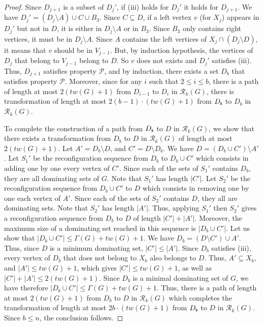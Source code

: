 \documentclass[10pt]{article}
\newcommand{\source}{{\sf s}}
\begin{document}
\begin{proof}
Since $D_{j+1}$ is a subset of $D_{j}'$, if (iii) holds for $D_j'$ it holds for $D_{j+1}$. We have $D_j'=(D_j\setminus A)\cup C \cup B_3$.
Since $C \subseteq D$, if a left vertex $v$ (for $X_j$) appears in $D_j'$ but not in $D$, it is either in $D_j \setminus A$ or in $B_3$. Since $B_3$ only contains right vertices, it must be in $D_j \setminus A$. Since $A$ contains the left vertices of $X_j \cap (D_j \setminus D)$, it means that $v$ should be in $V_{j-1}$. But, by induction hypothesis, the vertices of $D_j$ that belong to $V_{j-1}$ belong to $D$. So $v$ does not exists and $D_j'$ satisfies (iii). Thus, $D_{j+1}$ satisfies property $\mathcal{P}$, and by induction, there exists a set $D_{b}$ that satisfies property $\mathcal{P}$. Moreover, since for any $i$ such that $2\leq i\leq b$, there is a path of length at most $2(tw(G)+1)$ from $D_{i-1}$ to $D_{i}$ in $\mathcal{R}_k(G)$, there is transformation of length at most $2(b-1)\cdot(tw(G)+1)$ from $D_\source$ to $D_b$ in $\mathcal{R}_k(G)$. 
\medskip

To complete the construction of a path from $D_\source$ to $D$ in $\mathcal{R}_k(G)$, we show that there exists a transformation from $D_b$ to $D$ in $\mathcal{R}_k(G)$ of length at most $2(tw(G)+1)$.
Let $A'=D_b\setminus D$, and $C'=D\setminus D_b$. We have $D=(D_b\cup C')\setminus A'$. Let $S_1'$ be the reconfiguration sequence from $D_b$ to $D_b\cup C'$ which consists in adding one by one every vertex of $C'$. Since each of the sets of $S_1'$ contains $D_b$, they are all dominating sets of $G$. Note that $S_1'$ has length $|C'|$. Let $S_2'$ be the reconfiguration sequence from $D_b\cup C'$ to $D$ which consists in removing one by one each vertex of $A'$. Since each of the sets of $S_2'$ contains $D$, they all are dominating sets. Note that $S_2'$ has length $|A'|$. Thus, applying $S_1'$ then $S_2'$ gives a reconfiguration sequence from $D_b$ to $D$ of length $|C'|+|A'|$. Moreover, the maximum size of a dominating set reached in this sequence is $|D_b\cup C'|$. Let us show that $|D_b\cup C'|\leq \Gamma(G)+tw(G)+1$. We have $D_b=(D\setminus C')\cup A'$. Thus, since $D$ is a minimum dominating set, $|C'| \le |A'|$. Since $D_b$ satisfies (iii), every vertex of $D_b$ that does not belong to $X_b$ also belongs to $D$. Thus, $A'\subseteq X_b$, and $|A'|\leq tw(G)+1$, which gives $|C'|\leq tw(G)+1$, as well as $|C'|+|A'|\le 2(tw(G)+1)$. Since $D_b$ is a minimal dominating set of $G$, we have therefore $|D_b\cup C'|\leq \Gamma(G)+tw(G)+1$. Thus, there is a path of length at most $2(tw(G)+1)$ from $D_b$ to $D$ in $\mathcal{R}_k(G)$ which completes the transformation of length at most $2b\cdot(tw(G)+1)$ from $D_\source$ to $D$ in $\mathcal{R}_k(G)$. Since $b\leq n$, the conclusion follows.
\end{proof}



\end{document}
